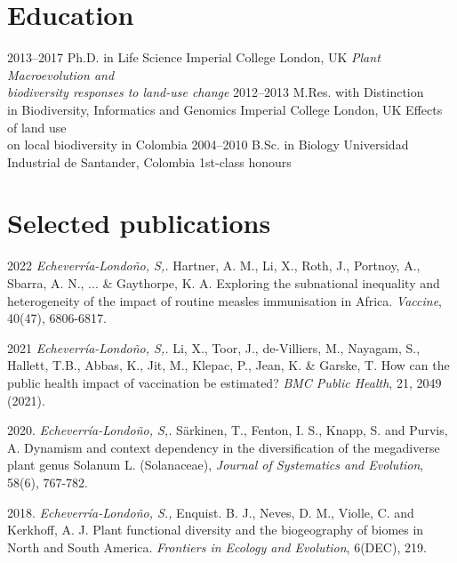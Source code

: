 \documentclass[icon]{twentysecondcv}
\begin{document}
\section{Education}

\begin{twenty}
  \twentyitem
    {2013--2017}
    {Ph.D. {\normalfont in Life Science}}
    {Imperial College London, UK}
    {\emph{Plant Macroevolution and \\  biodiversity responses to land-use change}}
  \twentyitem
    {2012--2013}
    {M.Res. with Distinction \\  {\normalfont in Biodiversity, Informatics and Genomics}}
    {Imperial College London, UK}
    {Effects of land use  \\  on local biodiversity in Colombia}
  \twentyitem
    {2004--2010}
    {B.Sc. in Biology}
    {Universidad Industrial de Santander, Colombia}
    {1st-class honours}
 \end{twenty}
 
 
 \section{Selected publications}

2022 \textit{Echeverr\'ia-Londo\~no, S,.}  Hartner, A. M., Li, X., Roth, J., Portnoy, A., Sbarra, A. N., ... \& Gaythorpe, K. A. Exploring the subnational inequality and heterogeneity of the impact of routine measles immunisation in Africa. \textit{Vaccine}, 40(47), 6806-6817. 

2021 \textit{Echeverr\'ia-Londo\~no, S,.}  Li, X., Toor, J., de-Villiers, M., Nayagam, S., Hallett, T.B., Abbas, K., Jit, M., Klepac, P., Jean, K. \&  Garske, T. How can the public health impact of vaccination be estimated? \textit{BMC Public Health}, 21, 2049 (2021).

2020. \textit{Echeverr\'ia-Londo\~no, S,.}  S{\"a}rkinen, T., Fenton, I. S., Knapp, S. and Purvis, A. Dynamism and context dependency in the diversification of the megadiverse plant genus Solanum L. (Solanaceae), \textit{Journal of Systematics and Evolution},  58(6), 767-782. 

2018. \textit{Echeverr\'ia-Londo\~no, S.,} Enquist. B. J., Neves, D. M., Violle, C. and Kerkhoff, A. J. Plant functional diversity and the biogeography of biomes in North and South America. \textit{Frontiers in Ecology and Evolution}, 6(DEC), 219.



\end{document}
